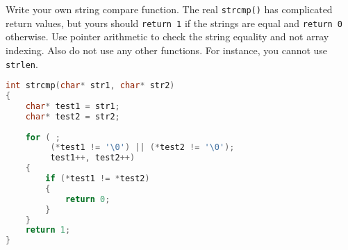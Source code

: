 \documentclass[12pt]{exam}
\begin{document}
\begin{questions}
\question
Write your own string compare function.
The real {\tt strcmp()} has complicated return values, but yours should {\tt return 1} if the strings are equal and {\tt return 0} otherwise.
Use pointer arithmetic to check the string equality and not array indexing.
Also do not use any other functions.
For instance, you cannot use {\tt strlen}.

\begin{lstlisting}[language=c]
int strcmp(char* str1, char* str2)
{
    char* test1 = str1;
    char* test2 = str2;
    
    for ( ; 
         (*test1 != '\0') || (*test2 != '\0'); 
         test1++, test2++)
    {
        if (*test1 != *test2)
        {
            return 0;
        }
    }
    return 1;
}
\end{lstlisting}

\end{questions}
\end{document}
